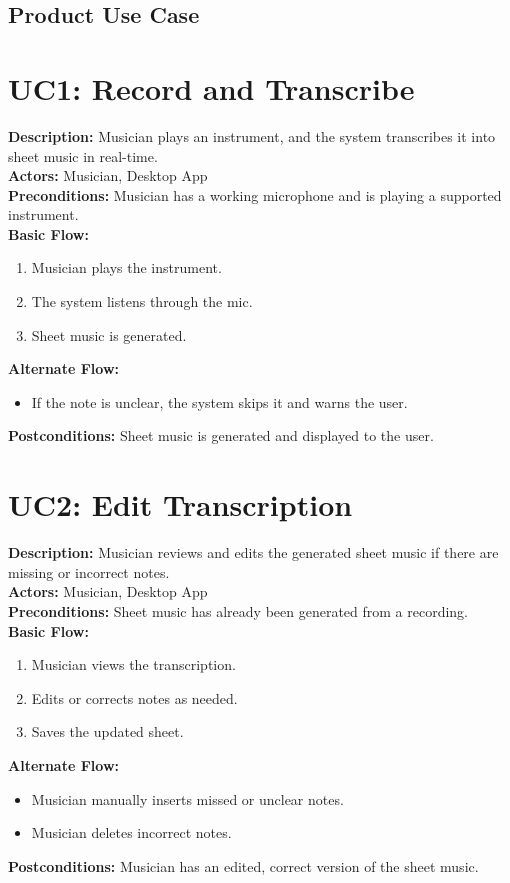 \documentclass[12pt]{article}
\begin{document}
\subsection{Product Use Case}
\section*{UC1: Record and Transcribe}
\textbf{Description:} Musician plays an instrument, and the system transcribes it into sheet music in real-time. \\
\textbf{Actors:} Musician, Desktop App \\
\textbf{Preconditions:} Musician has a working microphone and is playing a supported instrument. \\
\textbf{Basic Flow:}
\begin{enumerate}
    \item Musician plays the instrument.
    \item The system listens through the mic.
    \item Sheet music is generated.
\end{enumerate}
\textbf{Alternate Flow:}
\begin{itemize}
    \item If the note is unclear, the system skips it and warns the user.
\end{itemize}
\textbf{Postconditions:} Sheet music is generated and displayed to the user. 

\section*{UC2: Edit Transcription}
\textbf{Description:} Musician reviews and edits the generated sheet music if there are missing or incorrect notes. \\
\textbf{Actors:} Musician, Desktop App \\
\textbf{Preconditions:} Sheet music has already been generated from a recording. \\
\textbf{Basic Flow:}
\begin{enumerate}
    \item Musician views the transcription.
    \item Edits or corrects notes as needed.
    \item Saves the updated sheet.
\end{enumerate}
\textbf{Alternate Flow:}
\begin{itemize}
    \item Musician manually inserts missed or unclear notes.
    \item Musician deletes incorrect notes.
\end{itemize}
\textbf{Postconditions:} Musician has an edited, correct version of the sheet music.
\end{document}
